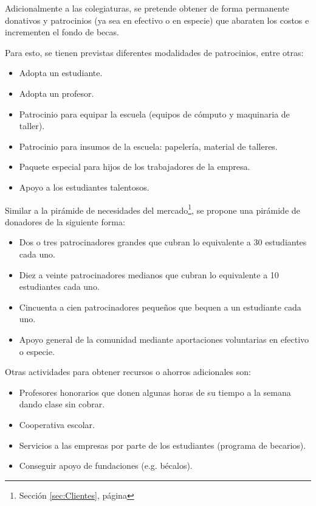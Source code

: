 Adicionalmente a las colegiaturas, se pretende obtener de forma permanente donativos y patrocinios (ya sea en efectivo o en especie) que abaraten los costos e incrementen el fondo de becas.

Para esto, se tienen previstas diferentes modalidades de patrocinios, entre otras:

\begin{itemize}
	\item Adopta un estudiante.
	\item Adopta un profesor.
	\item Patrocinio para equipar la escuela (equipos de cómputo y maquinaria de taller).
	\item Patrocinio para insumos de la escuela: papelería, material de talleres.
	\item Paquete especial para hijos de los trabajadores de la empresa.
	\item Apoyo a los estudiantes talentosos.
\end{itemize}

Similar a la pirámide de necesidades del mercado\footnote{Sección \ref{sec:Clientes}, página \pageref{sec:Clientes}}, se propone una pirámide de donadores de la siguiente forma:

\begin{itemize}
	\item Dos o tres patrocinadores grandes que cubran lo equivalente a 30 estudiantes cada uno.
	\item Diez a veinte patrocinadores medianos que cubran lo equivalente a 10 estudiantes cada uno.
	\item Cincuenta a cien patrocinadores pequeños que bequen a un estudiante cada uno.
	\item Apoyo general de la comunidad mediante aportaciones voluntarias en efectivo o especie.
\end{itemize}

Otras actividades para obtener recursos o ahorros adicionales son:

\begin{itemize}
	\item Profesores honorarios que donen algunas horas de su tiempo a la semana dando clase sin cobrar.
	\item Cooperativa escolar.
	\item Servicios a las empresas por parte de los estudiantes (programa de becarios).
	\item Conseguir apoyo de fundaciones (e.g. bécalos).
\end{itemize}
